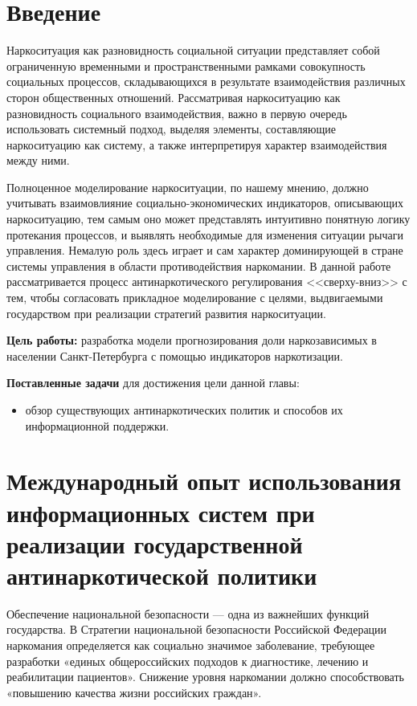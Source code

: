 \newpage
\section*{Введение}

Наркоситуация как разновидность социальной ситуации представляет собой 
ограниченную временными и пространственными рамками совокупность социальных 
процессов, складывающихся в результате взаимодействия различных сторон 
общественных отношений.  Рассматривая наркоситуацию как разновидность 
социального взаимодействия, важно в первую очередь использовать системный 
подход, выделяя элементы, составляющие наркоситуацию как систему, а также 
интерпретируя характер взаимодействия между ними.

Полноценное моделирование наркоситуации, по нашему мнению, должно учитывать 
взаимовлияние социально-экономических индикаторов, описывающих наркоситуацию, 
тем самым оно может представлять интуитивно понятную логику протекания 
процессов, и выявлять необходимые для изменения ситуации рычаги управления.  
Немалую роль здесь играет и сам характер доминирующей в стране системы 
управления в области противодействия наркомании.  В данной работе 
рассматривается процесс антинаркотического регулирования <<сверху-вниз>> с тем, 
чтобы согласовать прикладное моделирование с целями, выдвигаемыми государством 
при реализации стратегий развития наркоситуации.

\textbf{Цель работы:} разработка модели прогнозирования доли наркозависимых в 
населении Санкт-Петербурга с помощью индикаторов наркотизации.

\textbf{Поставленные задачи} для достижения цели данной главы:
\begin{itemize}
    \item обзор существующих антинаркотических политик и способов их 
        информационной поддержки.
\end{itemize} 



\newpage
\section{Международный опыт использования информационных систем при реализации 
    государственной антинаркотической политики}

Обеспечение национальной безопасности — одна из важнейших функций государства.  
В Стратегии национальной безопасности Российской Федерации 
\cite{ru_nat_def_strat} наркомания определяется как социально значимое 
заболевание, требующее разработки «единых общероссийских подходов к диагностике, 
лечению и реабилитации пациентов».  Снижение уровня наркомании должно 
способствовать «повышению качества жизни российских граждан».


